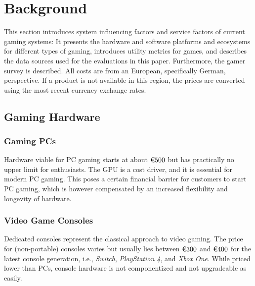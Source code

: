 \section{Background}
\label{sec:background}
This section introduces system influencing factors and service factors
of current gaming systems:
It presents the hardware and software platforms and ecosystems
for different types of gaming, introduces utility metrics for games,
and describes the data sources used for the evaluations in this paper.
Furthermore, the gamer survey is described.
All costs are from an European, specifically German, perspective. If a
product is not available in this region, the prices are converted using
the most recent currency exchange rates.

\subsection{Gaming Hardware}\label{sec:gaming-hardware}

\subsubsection{Gaming \acrshort{PC}s}
Hardware viable for \gls{PC} gaming starts at about $\text{\texteuro} 500$ but
has practically no upper limit for enthusiasts. The \gls{GPU}
is a cost driver, and it is essential for modern \gls{PC} gaming.
This poses a certain financial barrier for customers to start \gls{PC} gaming,
which is however compensated by an increased flexibility and longevity of
hardware.

\subsubsection{Video Game Consoles}
Dedicated consoles represent the classical approach to video gaming.
The price for (non-portable) consoles varies but usually lies between
$\text{\texteuro} 300$ and $\text{\texteuro} 400$ for the latest console
generation, i.e., \textit{Switch}, \textit{PlayStation 4}, and
\textit{Xbox One}.
While priced lower than \glspl{PC}, console hardware is not componentized
and not upgradeable as easily.

